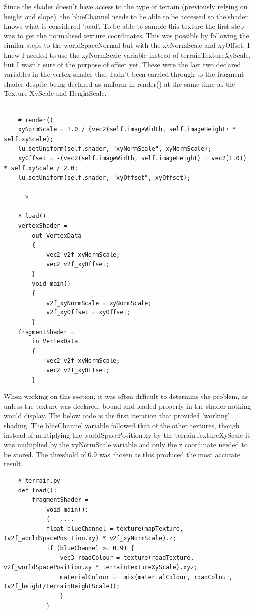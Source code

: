 \documentclass[a4 paper, 12pt]{article}
\begin{document}
Since the shader doesn't have access to the type of terrain (previously relying on height and slope), the blueChannel needs to be able to be accessed so the shader knows what is considered 'road'. To be able to sample this texture the first step was to get the normalised texture coordinates. This was possible by following the similar steps to the worldSpaceNormal but with the xyNormScale and xyOffset. I knew I needed to use the xyNormScale variable instead of terrainTextureXyScale, but I wasn't sure of the purpose of offset yet. These were the last two declared variables in the vertex shader that hadn't been carried through to the fragment shader despite being declared as uniform in render() at the same time as the Texture XyScale and HeightScale.
\begin{lstlisting}

    # render()      
    xyNormScale = 1.0 / (vec2(self.imageWidth, self.imageHeight) * self.xyScale);
    lu.setUniform(self.shader, "xyNormScale", xyNormScale);
    xyOffset = -(vec2(self.imageWidth, self.imageHeight) + vec2(1.0)) * self.xyScale / 2.0;
    lu.setUniform(self.shader, "xyOffset", xyOffset);

    --> 

    # load()
    vertexShader =
        out VertexData
        {
            vec2 v2f_xyNormScale;
            vec2 v2f_xyOffset;
        }
        void main()
        {
            v2f_xyNormScale = xyNormScale;
            v2f_xyOffset = xyOffset;
        }
    fragmentShader = 
        in VertexData
        {
            vec2 v2f_xyNormScale;
            vec2 v2f_xyOffset;
        }
    \end{lstlisting}

When working on this section, it was often difficult to determine the problem, as unless the texture was declared, bound and loaded properly in the shader nothing would display. The below code is the first iteration that provided 'working' shading. The blueChannel variable followed that of the other textures, though instead of multiplying the worldSpacePosition.xy by the terrainTextureXyScale it was multiplied by the xyNormScale variable and only the z coordinate needed to be stored. The threshold of 0.9 was chosen as this produced the most accurate result. 
    \begin{lstlisting}
    # terrain.py       
    def load():
        fragmentShader =                 
            void main():
            {   ....
            float blueChannel = texture(mapTexture, (v2f_worldSpacePosition.xy) * v2f_xyNormScale).z;
            if (blueChannel >= 0.9) {
                vec3 roadColour = texture(roadTexture, v2f_worldSpacePosition.xy * terrainTextureXyScale).xyz;
                materialColour =  mix(materialColour, roadColour, (v2f_height/terrainHeightScale));
                }
            }
    \end{lstlisting} 
    
\end{document}
